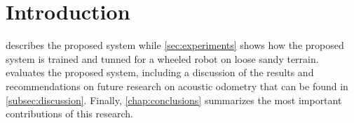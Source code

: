 
\section{Introduction} \label{sec:introduction}





 describes the proposed system while \cref{sec:experiments}
shows how the proposed system is trained and tunned for a wheeled robot on
loose sandy terrain.  evaluates the proposed system,
including a discussion of the results and recommendations on future research on
acoustic odometry that can be found in \cref{subsec:discussion}. Finally,
\cref{chap:conclusions} summarizes the most important contributions of this
research.